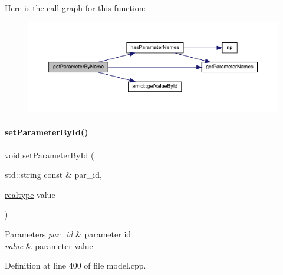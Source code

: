 Here is the call graph for this function\+:
\nopagebreak
\begin{figure}[H]
\begin{center}
\leavevmode
\includegraphics[width=350pt]{classamici_1_1_model_a19b349ca9793d45fda7ef8ea7422747a_cgraph}
\end{center}
\end{figure}
\mbox{\label{classamici_1_1_model_a995357a19663980279249d4b89a88f7a}} 
\paragraph{\texorpdfstring{set\+Parameter\+By\+Id()}{setParameterById()}}
{\footnotesize\ttfamily void set\+Parameter\+By\+Id (\begin{DoxyParamCaption}\item[{std\+::string const \&}]{par\+\_\+id,  }\item[{\mbox{\hyperlink{namespaceamici_a1bdce28051d6a53868f7ccbf5f2c14a3}{realtype}}}]{value }\end{DoxyParamCaption})}


\begin{DoxyParams}{Parameters}
{\em par\+\_\+id} & parameter id \\
\hline
{\em value} & parameter value \\
\hline
\end{DoxyParams}


Definition at line 400 of file model.\+cpp.

